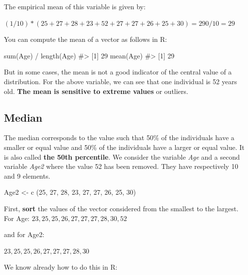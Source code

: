 \documentclass[
  letterpaper,
  DIV=11,
  numbers=noendperiod]{scrreprt}
\newenvironment{Shaded}{\begin{snugshade}}{\end{snugshade}}
\newcommand{\CommentTok}[1]{\textcolor[rgb]{0.37,0.37,0.37}{#1}}
\newcommand{\DecValTok}[1]{\textcolor[rgb]{0.68,0.00,0.00}{#1}}
\newcommand{\FunctionTok}[1]{\textcolor[rgb]{0.28,0.35,0.67}{#1}}
\newcommand{\NormalTok}[1]{\textcolor[rgb]{0.00,0.23,0.31}{#1}}
\newcommand{\OtherTok}[1]{\textcolor[rgb]{0.00,0.23,0.31}{#1}}
\newcommand{\SpecialCharTok}[1]{\textcolor[rgb]{0.37,0.37,0.37}{#1}}
\begin{document}
The empirical mean of this variable is given by:

\((1 / 10) * (25 + 27 + 28 + 23 + 52 + 27 + 27 + 26 + 25 + 30) = 290 / 10 = 29\)

You can compute the mean of a vector as follows in R:

\begin{Shaded}
\begin{Highlighting}[]
\FunctionTok{sum}\NormalTok{(Age) }\SpecialCharTok{/} \FunctionTok{length}\NormalTok{(Age)}
\CommentTok{\#\textgreater{} [1] 29}
\FunctionTok{mean}\NormalTok{(Age)}
\CommentTok{\#\textgreater{} [1] 29}
\end{Highlighting}
\end{Shaded}

But in some cases, the mean is not a good indicator of the central value
of a distribution. For the above variable, we can see that one
individual is 52 years old. \textbf{The mean is sensitive to extreme
values} or outliers.

\subsection{Median}\label{median}

The median corresponds to the value such that 50\% of the individuals
have a smaller or equal value and 50\% of the individuals have a larger
or equal value. It is also called \textbf{the 50th percentile}. We
consider the variable \emph{Age} and a second variable \emph{Age2} where
the value 52 has been removed. They have respectively 10 and 9 elements.

\begin{Shaded}
\begin{Highlighting}[]
\NormalTok{Age2 }\OtherTok{\textless{}{-}} \FunctionTok{c}\NormalTok{ (}\DecValTok{25}\NormalTok{, }\DecValTok{27}\NormalTok{, }\DecValTok{28}\NormalTok{, }\DecValTok{23}\NormalTok{, }\DecValTok{27}\NormalTok{, }\DecValTok{27}\NormalTok{, }\DecValTok{26}\NormalTok{, }\DecValTok{25}\NormalTok{, }\DecValTok{30}\NormalTok{)}
\end{Highlighting}
\end{Shaded}

First, \textbf{sort} the values of the vector considered from the
smallest to the largest. For Age:
\({23, 25, 25, 26, 27, 27, 27, 28, 30, 52}\)

and for Age2:

\({23, 25, 25, 26, 27, 27, 27, 28, 30}\)

We know already how to do this in R:
\end{document}
